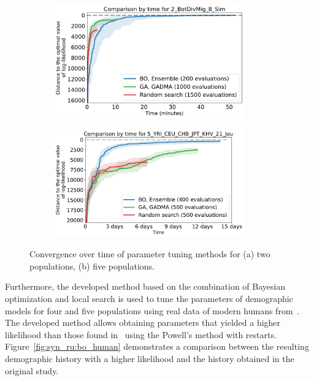 \begin{figure}[ht]
\centering
\begin{subfigure}[b]{0.49\linewidth}
\centering
\includegraphics[width=0.9\textwidth]{images_experiments/bo_ga/2_BotDivMig_8_Sim_bo_ga_time.pdf}
\caption{}
\end{subfigure}%
\begin{subfigure}[b]{0.49\linewidth}
\centering
\includegraphics[width=0.9\textwidth]{images_experiments/bo_ga/5_YRI_CEU_CHB_JPT_KHV_21_Jou_bo_ga_time.pdf}
\caption{}
\end{subfigure}
\caption{Convergence over time of parameter tuning methods for (a) two populations, (b) five populations.}
\end{figure}

Furthermore, the developed method based on the combination of Bayesian optimization and local search is used to tune the parameters of demographic models for four and five populations using real data of modern humans from~\cite{jouganous2017inferring}.
The developed method allows obtaining parameters that yielded a higher likelihood than those found in~\cite{jouganous2017inferring} using the Powell's method with restarts.
Figure~\ref{fig:syn_ru:bo_human} demonstrates a comparison between the resulting demographic history with a higher likelihood and the history obtained in the original study.

